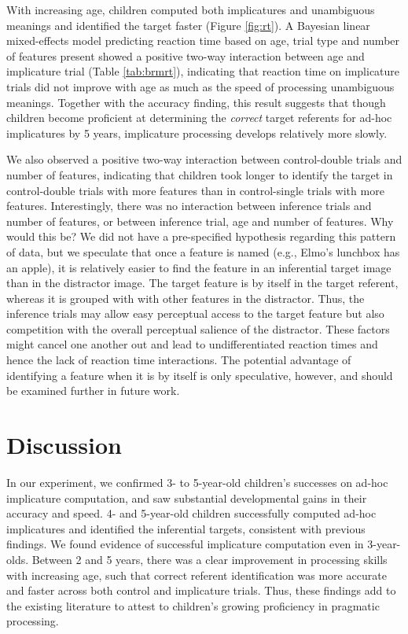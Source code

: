 \documentclass[man]{apa6}
\theoremstyle{definition}
\theoremstyle{definition}
\theoremstyle{definition}
\theoremstyle{remark}
\begin{document}
With increasing age, children computed both implicatures and unambiguous
meanings and identified the target faster (Figure \ref{fig:rt}). A
Bayesian linear mixed-effects model predicting reaction time based on
age, trial type and number of features present showed a positive two-way
interaction between age and implicature trial (Table \ref{tab:brmrt}),
indicating that reaction time on implicature trials did not improve with
age as much as the speed of processing unambiguous meanings. Together
with the accuracy finding, this result suggests that though children
become proficient at determining the \emph{correct} target referents for
ad-hoc implicatures by 5 years, implicature processing develops
relatively more slowly.

We also observed a positive two-way interaction between control-double
trials and number of features, indicating that children took longer to
identify the target in control-double trials with more features than in
control-single trials with more features. Interestingly, there was no
interaction between inference trials and number of features, or between
inference trial, age and number of features. Why would this be? We did
not have a pre-specified hypothesis regarding this pattern of data, but
we speculate that once a feature is named (e.g., Elmo's lunchbox has an
apple), it is relatively easier to find the feature in an inferential
target image than in the distractor image. The target feature is by
itself in the target referent, whereas it is grouped with with other
features in the distractor. Thus, the inference trials may allow easy
perceptual access to the target feature but also competition with the
overall perceptual salience of the distractor. These factors might
cancel one another out and lead to undifferentiated reaction times and
hence the lack of reaction time interactions. The potential advantage of
identifying a feature when it is by itself is only speculative, however,
and should be examined further in future work.

\section{Discussion}\label{discussion}

In our experiment, we confirmed 3- to 5-year-old children's successes on
ad-hoc implicature computation, and saw substantial developmental gains
in their accuracy and speed. 4- and 5-year-old children successfully
computed ad-hoc implicatures and identified the inferential targets,
consistent with previous findings. We found evidence of successful
implicature computation even in 3-year-olds. Between 2 and 5 years,
there was a clear improvement in processing skills with increasing age,
such that correct referent identification was more accurate and faster
across both control and implicature trials. Thus, these findings add to
the existing literature to attest to children's growing proficiency in
pragmatic processing.
\end{document}
